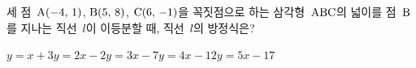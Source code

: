 세 점~$\mathrm{A}(-4,\mkern3mu 1)$, $\mathrm{B}(5,\mkern3mu 8)$, $\mathrm{C}(6,\mkern3mu -1)$을 꼭짓점으로 하는 삼각형~$\mathrm{ABC}$의 넓이를 점~$\mathrm{B}$를 지나는 직선~$l$이 이등분할 때, 직선~$l$의 방정식은?
\begin{choices32}{$y=x+3$}{$y=2x-2$}{$y=3x-7$}{$y=4x-12$}{$y=5x-17$}\end{choices32}
